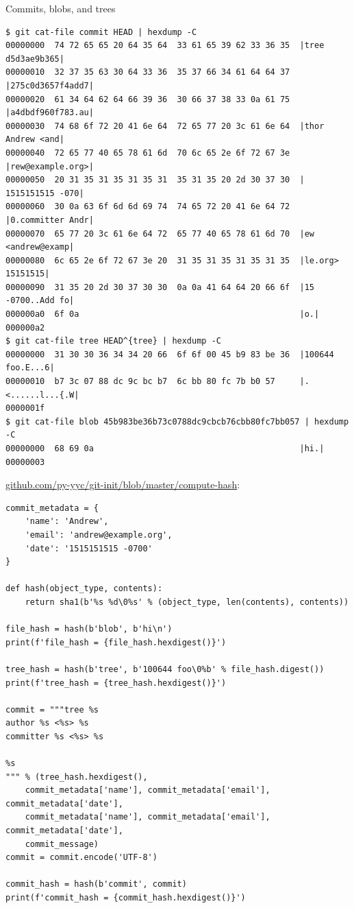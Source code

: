 \documentclass[xcolor=svgnames,17pt]{beamer}
\newcommand*{\sizefont}[1]{%
    \ifcase#1\relax
    \or \tiny
    \or \scriptsize
    \or \footnotesize
    \or \small
    \or \normalsize
    \or \large
    \or \Large
    \or \LARGE
    \or \huge
    \or \Huge
    \fi}
\begin{document}
\begin{frame}[fragile]{Commits, blobs, and trees}
\sizefont{1}
\begin{verbatim}
$ git cat-file commit HEAD | hexdump -C
00000000  74 72 65 65 20 64 35 64  33 61 65 39 62 33 36 35  |tree d5d3ae9b365|
00000010  32 37 35 63 30 64 33 36  35 37 66 34 61 64 64 37  |275c0d3657f4add7|
00000020  61 34 64 62 64 66 39 36  30 66 37 38 33 0a 61 75  |a4dbdf960f783.au|
00000030  74 68 6f 72 20 41 6e 64  72 65 77 20 3c 61 6e 64  |thor Andrew <and|
00000040  72 65 77 40 65 78 61 6d  70 6c 65 2e 6f 72 67 3e  |rew@example.org>|
00000050  20 31 35 31 35 31 35 31  35 31 35 20 2d 30 37 30  | 1515151515 -070|
00000060  30 0a 63 6f 6d 6d 69 74  74 65 72 20 41 6e 64 72  |0.committer Andr|
00000070  65 77 20 3c 61 6e 64 72  65 77 40 65 78 61 6d 70  |ew <andrew@examp|
00000080  6c 65 2e 6f 72 67 3e 20  31 35 31 35 31 35 31 35  |le.org> 15151515|
00000090  31 35 20 2d 30 37 30 30  0a 0a 41 64 64 20 66 6f  |15 -0700..Add fo|
000000a0  6f 0a                                             |o.|
000000a2
$ git cat-file tree HEAD^{tree} | hexdump -C
00000000  31 30 30 36 34 34 20 66  6f 6f 00 45 b9 83 be 36  |100644 foo.E...6|
00000010  b7 3c 07 88 dc 9c bc b7  6c bb 80 fc 7b b0 57     |.<......l...{.W|
0000001f
$ git cat-file blob 45b983be36b73c0788dc9cbcb76cbb80fc7bb057 | hexdump -C
00000000  68 69 0a                                          |hi.|
00000003
\end{verbatim}
\end{frame}

\begin{frame}[fragile]
\sizefont{1}
\href{https://github.com/py-yyc/git-init/blob/master/compute-hash}{github.com/py-yyc/git-init/blob/master/compute-hash}:
\begin{verbatim}
commit_metadata = {
    'name': 'Andrew',
    'email': 'andrew@example.org',
    'date': '1515151515 -0700'
}

def hash(object_type, contents):
    return sha1(b'%s %d\0%s' % (object_type, len(contents), contents))

file_hash = hash(b'blob', b'hi\n')
print(f'file_hash = {file_hash.hexdigest()}')

tree_hash = hash(b'tree', b'100644 foo\0%b' % file_hash.digest())
print(f'tree_hash = {tree_hash.hexdigest()}')

commit = """tree %s
author %s <%s> %s
committer %s <%s> %s

%s
""" % (tree_hash.hexdigest(),
    commit_metadata['name'], commit_metadata['email'], commit_metadata['date'],
    commit_metadata['name'], commit_metadata['email'], commit_metadata['date'],
    commit_message)
commit = commit.encode('UTF-8')

commit_hash = hash(b'commit', commit)
print(f'commit_hash = {commit_hash.hexdigest()}')
\end{verbatim}
\end{frame}
\end{document}

